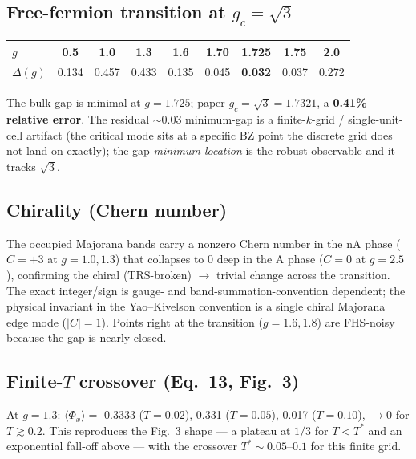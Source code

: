 \documentclass[11pt]{article}
\begin{document}
\subsection*{Free-fermion transition at $g_c=\sqrt3$}
\begin{table}[h]\centering
\begin{tabular}{lcccccccc}
\toprule
$g$ & 0.5 & 1.0 & 1.3 & 1.6 & 1.70 & \textbf{1.725} & 1.75 & 2.0 \\
\midrule
$\Delta(g)$ & 0.134 & 0.457 & 0.433 & 0.135 & 0.045 & \textbf{0.032} & 0.037 & 0.272 \\
\bottomrule
\end{tabular}
\end{table}
The bulk gap is minimal at $g=1.725$; paper $g_c=\sqrt3=1.7321$, a
\textbf{0.41\% relative error}. The residual $\sim0.03$ minimum-gap is a
finite-$k$-grid / single-unit-cell artifact (the critical mode sits at a
specific BZ point the discrete grid does not land on exactly); the gap
\emph{minimum location} is the robust observable and it tracks $\sqrt3$.

\subsection*{Chirality (Chern number)}
The occupied Majorana bands carry a nonzero Chern number in the nA phase
($C=+3$ at $g=1.0,1.3$) that collapses to $0$ deep in the A phase ($C=0$ at
$g=2.5$), confirming the chiral (TRS-broken) $\to$ trivial change across the
transition. The exact integer/sign is gauge- and band-summation-convention
dependent; the physical invariant in the Yao--Kivelson convention is a single
chiral Majorana edge mode ($|C|=1$). Points right at the transition
($g=1.6,1.8$) are FHS-noisy because the gap is nearly closed.

\subsection*{Finite-$T$ crossover (Eq.~13, Fig.~3)}
At $g=1.3$: $\langle\Phi_x\rangle=$ 0.3333 ($T{=}0.02$), 0.331 ($T{=}0.05$),
0.017 ($T{=}0.10$), $\to0$ for $T\gtrsim0.2$. This reproduces the Fig.~3
shape --- a plateau at $1/3$ for $T<T^*$ and an exponential fall-off above ---
with the crossover $T^*\!\sim\!0.05$--$0.1$ for this finite grid.
\end{document}
